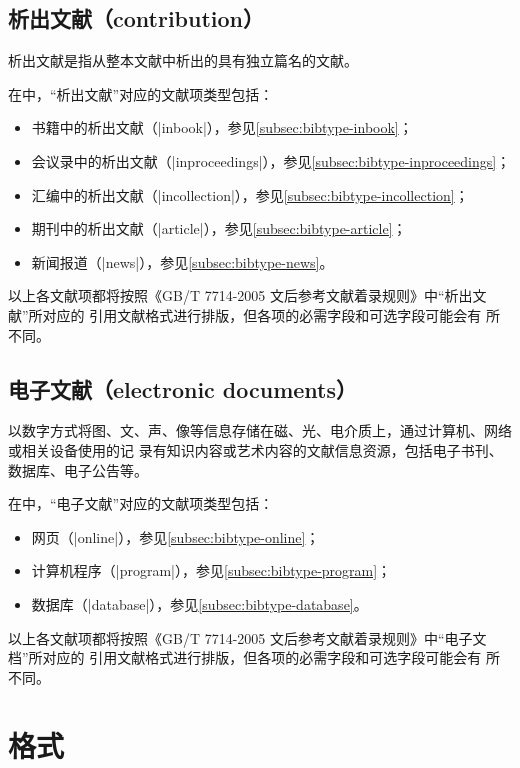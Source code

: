 \subsection{析出文献（contribution）}

析出文献是指从整本文献中析出的具有独立篇名的文献。 

在{\njuthesis}中，“析出文献”对应的{\BibTeX}文献项类型包括：
\begin{itemize}
\item 书籍中的析出文献（|inbook|），参见\ref{subsec:bibtype-inbook}；
\item 会议录中的析出文献（|inproceedings|），参见\ref{subsec:bibtype-inproceedings}；
\item 汇编中的析出文献（|incollection|），参见\ref{subsec:bibtype-incollection}；
\item 期刊中的析出文献（|article|），参见\ref{subsec:bibtype-article}；
\item 新闻报道（|news|），参见\ref{subsec:bibtype-news}。
\end{itemize}

以上各文献项都将按照《GB/T 7714-2005 文后参考文献着录规则》中“析出文献”所对应的
引用文献格式进行排版\cite{gbt7714-2005}，但各项的必需字段和可选字段可能会有
所不同。

\subsection{电子文献（electronic documents）}

以数字方式将图、文、声、像等信息存储在磁、光、电介质上，通过计算机、网络或相关设备使用的记
录有知识内容或艺术内容的文献信息资源，包括电子书刊、数据库、电子公告等。

在{\njuthesis}中，“电子文献”对应的{\BibTeX}文献项类型包括：
\begin{itemize}
\item 网页（|online|），参见\ref{subsec:bibtype-online}；
\item 计算机程序（|program|），参见\ref{subsec:bibtype-program}；
\item 数据库（|database|），参见\ref{subsec:bibtype-database}。
\end{itemize}

以上各文献项都将按照《GB/T 7714-2005 文后参考文献着录规则》中“电子文档”所对应的
引用文献格式进行排版\cite{gbt7714-2005}，但各项的必需字段和可选字段可能会有
所不同。

\section{格式}\label{sec:bib-format}

